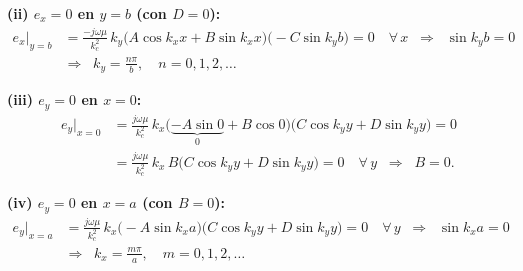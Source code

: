 \documentclass[
  11pt,
  letterpaper,
   addpoints,
   answers
  ]{exam}
\begin{document}
\begin{questions}
\begin{parts}
\begin{subparts}
\begin{solution}
\vspace{2pt}
\noindent\textbf{(ii) $e_x=0$ en $y=b$ (con $D=0$):}
\begin{align*}
e_x\big|_{y=b}
&=\frac{-j\omega\mu}{k_c^2}\,k_y\bigl(A\cos k_x x+B\sin k_x x\bigr)
  \bigl(-C\sin k_y b\bigr)=0
\quad\forall\, x
\;\;\Longrightarrow\;\; \sin k_y b=0\\
&\Longrightarrow\;\; \boxed{k_y=\frac{n\pi}{b},\quad n=0,1,2,\dots}
\end{align*}

\vspace{2pt}
\noindent\textbf{(iii) $e_y=0$ en $x=0$:}
\begin{align*}
e_y\big|_{x=0}
&=\frac{j\omega\mu}{k_c^2}\,k_x
  \bigl(\underbrace{-A\sin 0}_{0}+B\cos 0\bigr)
  \bigl(C\cos k_y y+D\sin k_y y\bigr)=0\\
&=\frac{j\omega\mu}{k_c^2}\,k_x\,B\bigl(C\cos k_y y+D\sin k_y y\bigr)=0
\quad\forall\, y
\;\;\Longrightarrow\;\; \boxed{B=0.}
\end{align*}

\vspace{2pt}
\noindent\textbf{(iv) $e_y=0$ en $x=a$ (con $B=0$):}
\begin{align*}
e_y\big|_{x=a}
&=\frac{j\omega\mu}{k_c^2}\,k_x
  \bigl(-A\sin k_x a\bigr)
  \bigl(C\cos k_y y+D\sin k_y y\bigr)=0
\quad\forall\, y
\;\;\Longrightarrow\;\; \sin k_x a=0\\
&\Longrightarrow\;\; \boxed{k_x=\frac{m\pi}{a},\quad m=0,1,2,\dots}
\end{align*}


\end{solution}
\end{subparts}
\end{parts}
\end{questions}
\end{document}
